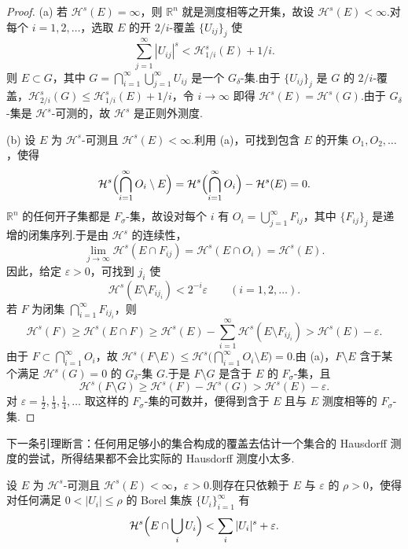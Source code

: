 \begin{proof}
(a) 若 $\mathcal{H}^s(E)=\infty$，则 $\mathbb{R}^n$ 就是测度相等之开集，故设 $\mathcal{H}^s(E)<\infty$.对每个 $i=1,2,\ldots$，选取 $E$ 的开 $2/i$-覆盖 $\{U_{ij}\}_j$ 使
\[
  \sum_{j=1}^{\infty}|U_{ij}|^s<\mathcal{H}^s_{1/i}(E)+1/i.
\]
则 $E\subset G$，其中 $G=\bigcap_{i=1}^{\infty}\bigcup_{j=1}^{\infty}U_{ij}$ 是一个 $G_{\delta}$-集.由于 $\{U_{ij}\}_j$ 是 $G$ 的 $2/i$-覆盖，$\mathcal{H}^s_{2/i}(G)\leq\mathcal{H}^s_{1/i}(E)+1/i$，令 $i\to\infty$ 即得 $\mathcal{H}^s(E)=\mathcal{H}^s(G)$.由于 $G_{\delta}$-集是 $\mathcal{H}^s$-可测的，故 $\mathcal{H}^s$ 是正则外测度.

(b) 设 $E$ 为 $\mathcal{H}^s$-可测且 $\mathcal{H}^s(E)<\infty$.利用 (a)，可找到包含 $E$ 的开集 $O_1,O_2,\ldots$，使得
\[
  \mathcal{H}^s\Bigl(\bigcap_{i=1}^{\infty}O_i\setminus E\Bigr)
  =\mathcal{H}^s\Bigl(\bigcap_{i=1}^{\infty}O_i\Bigr)-\mathcal{H}^s(E)=0.
\]
$\mathbb{R}^n$ 的任何开子集都是 $F_{\sigma}$-集，故设对每个 $i$ 有 $O_i=\bigcup_{j=1}^{\infty}F_{ij}$，其中 $\{F_{ij}\}_j$ 是递增的闭集序列.于是由 $\mathcal{H}^s$ 的连续性，
\[
  \lim_{j\to\infty}\mathcal{H}^s(E\cap F_{ij})=\mathcal{H}^s(E\cap O_i)=\mathcal{H}^s(E).
\]
因此，给定 $\varepsilon>0$，可找到 $j_i$ 使
\[
  \mathcal{H}^s(E\setminus F_{ij_i})<2^{-i}\varepsilon\qquad(i=1,2,\ldots).
\]
若 $F$ 为闭集 $\bigcap_{i=1}^{\infty}F_{ij_i}$，则
\[
  \mathcal{H}^s(F)\geq\mathcal{H}^s(E\cap F)\geq\mathcal{H}^s(E)-\sum_{i=1}^{\infty}\mathcal{H}^s(E\setminus F_{ij_i})>\mathcal{H}^s(E)-\varepsilon.
\]
由于 $F\subset\bigcap_{i=1}^{\infty}O_i$，故 $\mathcal{H}^s(F\setminus E)\leq\mathcal{H}^s\bigl(\bigcap_{i=1}^{\infty}O_i\setminus E\bigr)=0$.由 (a)，$F\setminus E$ 含于某个满足 $\mathcal{H}^s(G)=0$ 的 $G_{\delta}$-集 $G$.于是 $F\setminus G$ 是含于 $E$ 的 $F_{\sigma}$-集，且
\[
  \mathcal{H}^s(F\setminus G)\geq\mathcal{H}^s(F)-\mathcal{H}^s(G)>\mathcal{H}^s(E)-\varepsilon.
\]
对 $\varepsilon=\frac{1}{2},\frac{1}{3},\frac{1}{4},\ldots$ 取这样的 $F_{\sigma}$-集的可数并，便得到含于 $E$ 且与 $E$ 测度相等的 $F_{\sigma}$-集.
\end{proof}

下一条引理断言：任何用足够小的集合构成的覆盖去估计一个集合的 Hausdorff 测度的尝试，所得结果都不会比实际的 Hausdorff 测度小太多.

\begin{lemma}\label{lem:1.7}
设 $E$ 为 $\mathcal{H}^s$-可测且 $\mathcal{H}^s(E)<\infty$，$\varepsilon>0$.则存在只依赖于 $E$ 与 $\varepsilon$ 的 $\rho>0$，使得对任何满足 $0<|U_i|\leq\rho$ 的 Borel 集族 $\{U_i\}_{i=1}^{\infty}$ 有
\[
  \mathcal{H}^{s}\Bigl(E\cap\bigcup_{i}U_i\Bigr)<\sum_{i}|U_i|^{s}+\varepsilon.
\]
\end{lemma}

